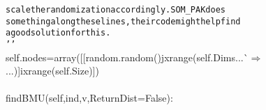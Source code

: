 {{\begin{tabbing}
{\texttt{\hspace{84pt}scale\hspace{6pt}the\hspace{6pt}randomization\hspace{6pt}accordingly.\hspace{12pt}SOM\_PAK\hspace{6pt}does\hspace{6pt}}}\\
{\texttt{\hspace{84pt}something\hspace{6pt}along\hspace{6pt}these\hspace{6pt}lines,\hspace{6pt}their\hspace{6pt}code\hspace{6pt}might\hspace{6pt}help\hspace{6pt}find}}\\
{\texttt{\hspace{84pt}a\hspace{6pt}good\hspace{6pt}solution\hspace{6pt}for\hspace{6pt}this.}}\\
{\texttt{\hspace{48pt}{'}}}{\texttt{{'}{'}}}\\
\hspace{48pt}self.nodes\hspace{6pt}=\hspace{6pt}array({[}{[}random.random()\hspace{6pt}j\hspace{6pt}xrange(self.Dims{}...\`$\Rightarrow$\\
...{}){]}\hspace{6pt}i\hspace{6pt}xrange(self.Size){]})\\
\\
\hspace{6pt}findBMU(self,ind,v,ReturnDist\hspace{6pt}=\hspace{6pt}False):\\

\end{tabbing}}}
